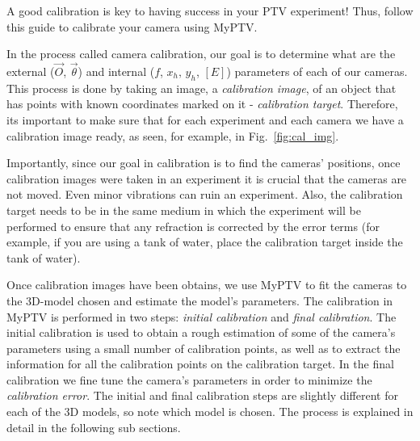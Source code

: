 \documentclass[10pt,a4paper]{article}
\begin{document}
A good calibration is key to having success in your PTV experiment! Thus, follow this guide to calibrate your camera using MyPTV. 


In the process called camera calibration, our goal is to determine what are the external ($\vec{O}$, $\vec{\theta}$) and internal ($f$, $x_h,\,y_h$, $[E]$) parameters of each of our cameras. This process is done by taking an image, a \textit{calibration image}, of an object that has points with known coordinates marked on it - \textit{calibration target}. Therefore, its important to make sure that for each experiment and each camera we have a calibration image ready, as seen, for example, in Fig.~\ref{fig:cal_img}.


Importantly, since our goal in calibration is to find the cameras' positions, once calibration images were taken in an experiment it is crucial that the cameras are not moved. Even minor vibrations can ruin an experiment. Also, the calibration target needs to be in the same medium in which the experiment will be performed to ensure that any refraction is corrected by the error terms (for example, if you are using a tank of water, place the calibration target inside the tank of water). 


Once calibration images have been obtains, we use MyPTV to fit the cameras to the 3D-model chosen and estimate the model's parameters. 
The calibration in MyPTV is performed in two steps: \textit{initial calibration} and \textit{final calibration}. The initial calibration is used to obtain a rough estimation of some of the camera's parameters using a small number of calibration points, as well as to extract the information for all the calibration points on the calibration target. In the final calibration we fine tune the camera's parameters in order to minimize the \textit{calibration error}. 
The initial and final calibration steps are slightly different for each of the 3D models, so note which model is chosen.
The process is explained in detail in the following sub sections. 


%
%
\end{document}
